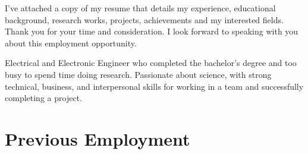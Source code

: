 \documentclass[11pt,a4paper,sans]{moderncv}        %
\begin{document}
I’ve attached a copy of my resume that details my experience, educational background, research works, projects, achievements and my interested fields.
Thank you for your time and consideration. I look forward to speaking with you about this employment opportunity.

\vspace{0.5cm}

\makeletterclosing %


\clearpage
\makecvtitle

\small{Electrical and Electronic Engineer who completed the bachelor's degree and too busy to spend time doing research. Passionate about science, with strong technical, business, and interpersonal skills for working in a team and successfully completing a project.}

\section{Previous Employment}

\vspace{6pt}
\end{document}

